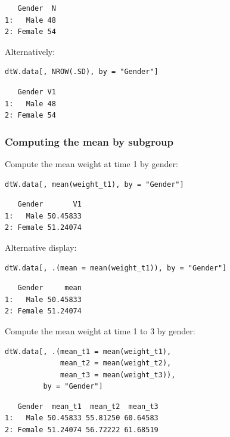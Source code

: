 \documentclass{article}
\begin{document}
\begin{verbatim}
   Gender  N
1:   Male 48
2: Female 54
\end{verbatim}

Alternatively:
\lstset{language=r,label= ,caption= ,captionpos=b,numbers=none}
\begin{lstlisting}
dtW.data[, NROW(.SD), by = "Gender"]
\end{lstlisting}

\begin{verbatim}
   Gender V1
1:   Male 48
2: Female 54
\end{verbatim}

\subsubsection{Computing the mean by subgroup}
\label{sec:org6d9d1bd}

Compute the mean weight at time 1 by gender:
\lstset{language=r,label= ,caption= ,captionpos=b,numbers=none}
\begin{lstlisting}
dtW.data[, mean(weight_t1), by = "Gender"]
\end{lstlisting}

\begin{verbatim}
   Gender       V1
1:   Male 50.45833
2: Female 51.24074
\end{verbatim}

Alternative display:
\lstset{language=r,label= ,caption= ,captionpos=b,numbers=none}
\begin{lstlisting}
dtW.data[, .(mean = mean(weight_t1)), by = "Gender"]
\end{lstlisting}

\begin{verbatim}
   Gender     mean
1:   Male 50.45833
2: Female 51.24074
\end{verbatim}

Compute the mean weight at time 1 to 3 by gender:
\lstset{language=r,label= ,caption= ,captionpos=b,numbers=none}
\begin{lstlisting}
dtW.data[, .(mean_t1 = mean(weight_t1),
			 mean_t2 = mean(weight_t2),
			 mean_t3 = mean(weight_t3)), 
		 by = "Gender"]
\end{lstlisting}

\begin{verbatim}
   Gender  mean_t1  mean_t2  mean_t3
1:   Male 50.45833 55.81250 60.64583
2: Female 51.24074 56.72222 61.68519
\end{verbatim}
\end{document}
